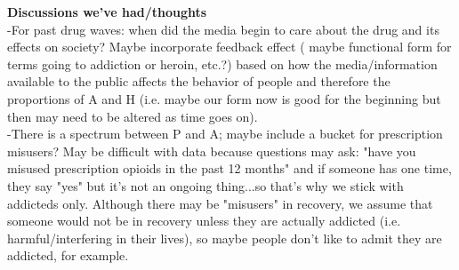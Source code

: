 \documentclass[12pt]{article}
\begin{document}
\textbf{Discussions we've had/thoughts} \\
-For past drug waves: when did the media begin to care about the drug and its effects on society? Maybe incorporate feedback effect ( maybe functional form for terms going to addiction or heroin, etc.?) based on how the media/information available to the public affects the behavior of people and therefore the proportions of A and H (i.e. maybe our form now is good for the beginning but then may need to be altered as time goes on).\\
-There is a spectrum between P and A; maybe include a bucket for prescription misusers? May be difficult with data because questions may ask: "have you misused prescription opioids in the past 12 months" and if someone has one time, they say "yes" but it's not an ongoing thing...so that's why we stick with addicteds only. Although there may be "misusers" in recovery, we assume that someone would not be in recovery unless they are actually addicted (i.e. harmful/interfering in their lives), so maybe people don't like to admit they are addicted, for example.



 




\pagebreak



 
\end{document}
